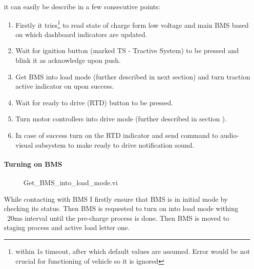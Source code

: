 it can easily be describe in a few consecutive points:
\begin{enumerate}
    \itemsep0.1em 
    \item Firstly it tries\footnote{within 1s timeout, after which default values are assumed. Error would be not crucial for functioning of vehicle so it is ignored} to read state of charge form low voltage and main BMS based on which dashboard indicators are updated.
    \item Wait for ignition button (marked TS - Tractive System) to be pressed and blink it as acknowledge upon push.
    \item Get BMS into load mode (further described in next section) and turn traction active indicator on upon success.
    \item Wait for ready to drive (RTD) button to be pressed.
    \item Turn motor controllers into drive mode (further described in section ).
    \item In case of success turn on the RTD indicator and send command to audio-visual subsystem to make ready to drive notification sound.
\end{enumerate}

\paragraph{Turning on BMS}
\begin{figure}[H]
    \centering
    \renewcommand{\thesubfigure}{}%
    \tightsubcaptions %
    \setlength{\subfloatlabelskip}{0pt}%
\end{figure}
\begin{figure}[H]\ContinuedFloat
    \centering
    \renewcommand{\thesubfigure}{}%
    \tightsubcaptions %
    \setlength{\subfloatlabelskip}{0pt}%
    \caption{Get\_BMS\_into\_load\_mode.vi}
    \label{vi:boot_BMS}
\end{figure}
While contacting with BMS I firstly ensure that BMS is in initial mode by checking its status. Then BMS is requested to turn on into load mode withing ~20ms interval until the pre-charge process is done. Then BMS is moved to staging process and active load letter one.

